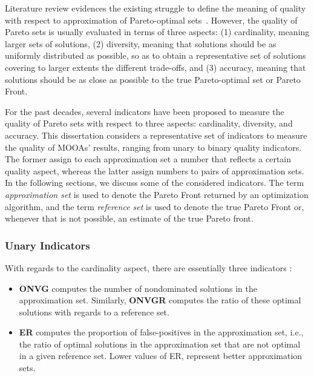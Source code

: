 	Literature review evidences the existing struggle to define the meaning of quality with respect to approximation of Pareto-optimal sets~\cite{Knowles2002Metrics,Riquelme2015}. However, the quality of Pareto sets is usually evaluated in terms of three aspects: (1) cardinality, meaning larger sets of solutions, (2) diversity, meaning that solutions should be as uniformly distributed as possible, so as to obtain a representative set of solutions covering to larger extents the different trade-offs, and (3) accuracy, meaning that solutions should be as close as possible to the true Pareto-optimal set or Pareto Front. 
	
	For the past decades, several indicators have been proposed to measure the quality of Pareto sets with respect to three aspects: cardinality, diversity, and accuracy. This dissertation considers a representative set of indicators to measure the quality of \acp{MOOA}' results, ranging from unary to binary quality indicators. The former assign to each approximation set a number that reflects a certain quality aspect, whereas the latter assign numbers to pairs of approximation sets. In the following sections, we discuss some of the considered indicators. The term \textit{approximation set} is used to denote the Pareto Front returned by an optimization algorithm, and the term \textit{reference set} is used to denote the true Pareto Front or, whenever that is not possible, an estimate of the true Pareto front. 	
	
	\subsubsection{Unary Indicators}
	With regards to the cardinality aspect, there are essentially three indicators \cite{Veldhuizen1999GD}:
	\begin{itemize}
		\item \textbf{\ac{ONVG}} computes the number of nondominated solutions in the approximation set. Similarly, \textbf{\ac{ONVGR}} computes the ratio of these optimal solutions with regards to a reference set.
		\item \textbf{\ac{ER}} computes the proportion of false-positives in the approximation set, i.e., the ratio of optimal solutions in the approximation set that are not optimal in a given reference set. Lower values of \ac{ER}, represent better approximation sets. 		
	\end{itemize}
	

